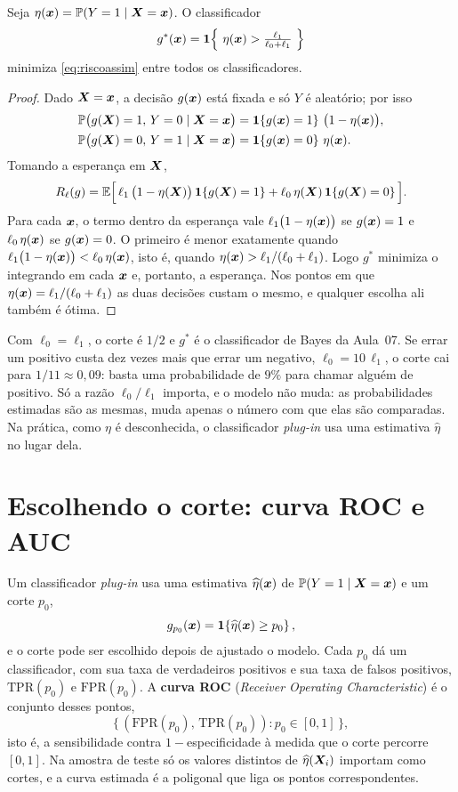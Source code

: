 \documentclass[11pt,a4paper]{article}
\begin{document}
\begin{proposicao}\label{prop:corte}
Seja $\eta(\bm{x})=\mathbb{P}(Y=1\mid\bm{X}=\bm{x})$. O classificador
\[
  g^*(\x)=\1{\ \eta(\x)>\tfrac{\ell_1}{\ell_0+\ell_1}\ }
\]
minimiza \eqref{eq:riscoassim} entre todos os classificadores.
\end{proposicao}
\begin{proof}
Dado $\bm{X}=\bm{x}$, a decisão $g(\bm{x})$ está fixada e só $Y$ é aleatório; por isso
\begin{align*}
  \mathbb{P}\big(g(\bm{X})=1,\,Y=0\mid\bm{X}=\bm{x}\big)&=\mathbf{1}\!\left\{g(\bm{x})=1\right\}\,\big(1-\eta(\bm{x})\big),\\
  \mathbb{P}\big(g(\bm{X})=0,\,Y=1\mid\bm{X}=\bm{x}\big)&=\mathbf{1}\!\left\{g(\bm{x})=0\right\}\,\eta(\bm{x}).
\end{align*}
Tomando a esperança em $\bm{X}$,
\[
  R_\ell(g)=\mathbb{E}\Big[\,\ell_1\,\big(1-\eta(\bm{X})\big)\,\mathbf{1}\!\left\{g(\bm{X})=1\right\}
                    +\ell_0\,\eta(\bm{X})\,\mathbf{1}\!\left\{g(\bm{X})=0\right\}\Big].
\]
Para cada $\bm{x}$, o termo dentro da esperança vale $\ell_1\big(1-\eta(\bm{x})\big)$ se
$g(\bm{x})=1$ e $\ell_0\,\eta(\bm{x})$ se $g(\bm{x})=0$. O primeiro é menor exatamente quando
$\ell_1\big(1-\eta(\bm{x})\big)<\ell_0\,\eta(\bm{x})$, isto é, quando
$\eta(\bm{x})>\ell_1/(\ell_0+\ell_1)$. Logo $g^*$ minimiza o integrando em cada $\bm{x}$ e,
portanto, a esperança. Nos pontos em que $\eta(\bm{x})=\ell_1/(\ell_0+\ell_1)$ as duas
decisões custam o mesmo, e qualquer escolha ali também é ótima.
\end{proof}

Com $\ell_0=\ell_1$, o corte é $1/2$ e $g^*$ é o classificador de Bayes da Aula~07. Se
errar um positivo custa dez vezes mais que errar um negativo, $\ell_0=10\,\ell_1$, o
corte cai para $1/11\approx0{,}09$: basta uma probabilidade de $9\%$ para chamar
alguém de positivo. Só a razão $\ell_0/\ell_1$ importa, e o modelo não muda: as
probabilidades estimadas são as mesmas, muda apenas o número com que elas são
comparadas. Na prática, como $\eta$ é desconhecida, o classificador \emph{plug-in} usa
uma estimativa $\widehat\eta$ no lugar dela.

\section{Escolhendo o corte: curva ROC e AUC}\label{sec:roc}
Um classificador \emph{plug-in} usa uma estimativa $\widehat\eta(\bm{x})$ de
$\mathbb{P}(Y=1\mid\bm{X}=\bm{x})$ e um corte $p_0$,
\[
  g_{p_0}(\bm{x})=\mathbf{1}\!\left\{\widehat\eta(\bm{x})\ge p_0\right\},
\]
e o corte pode ser escolhido depois de ajustado o modelo. Cada $p_0$ dá um
classificador, com sua taxa de verdadeiros positivos e sua taxa de falsos positivos,
$\text{TPR}(p_0)$ e $\text{FPR}(p_0)$. A \textbf{curva ROC} (\emph{Receiver Operating
Characteristic}) é o conjunto desses pontos,
\[
  \big\{\,(\text{FPR}(p_0),\,\text{TPR}(p_0)) : p_0\in[0,1]\,\big\},
\]
isto é, a sensibilidade contra $1-$especificidade à medida que o corte percorre
$[0,1]$. Na amostra de teste só os valores distintos de $\widehat\eta(\bm{X}_i)$ importam
como cortes, e a curva estimada é a poligonal que liga os pontos correspondentes.
\end{document}
